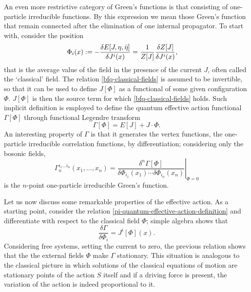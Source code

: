 An even more restrictive category of Green's functions is that consisting of one-particle irreducible functions. By this expression we mean those Green's function that remain connected after the elimination of one internal propagator.
To start with, consider the position
\begin{equation}\label{bfq-classical-fields}
\Phi_i(x)
	:=
- \frac{\delta E[J,\eta,\bar\eta]}{\delta J^i(x)}
	=
\frac{1}{Z[J]} \frac{\delta  Z[J] }{ \delta J^i(x) }  , 
	\hspace{1.25em}
\end{equation}
that is the average value of the field in the presence of the current $J$,
often called the `classical' field. The relation \eqref{bfq-classical-fields} is assumed to be invertible, so that it can be used to define $J[\Phi]$ as a functional of some given configuration $\Phi$. $J[\Phi]$ is then the source term for which \eqref{bfq-classical-fields} holds. Such implicit definition is employed to define the quantum effective action functional \( \Gamma[\Phi] \) through functional Legendre transform
\begin{equation}\label{pi-quantum-effective-action-definition}
\Gamma[\Phi ]
	=
E[J ] + J  \cdot \Phi .
\end{equation}
An interesting property of \(\Gamma\) is that it generates the vertex functions, \ie the one-particle irreducible correlation functions, by differentiation; considering only the bosonic fields,
\begin{equation}
\Gamma_n^{i_1 \ldots i_n} (x_1, \ldots, x_n)
	=
\left.
\frac{\delta^n \Gamma[\Phi ]}{\delta \Phi_{i_1}(x_1)
	 \cdots \delta
	 \Phi_{i_n}(x_n)}%
\right|_{\Phi  =0}
\end{equation}
is the $n$-point one-particle irreducible Green's function.

Let us now discuss some remarkable properties of the effective action. As a starting point, consider the relation \eqref{pi-quantum-effective-action-definition} and differentiate with respect to the classical field $\Phi$; simple algebra shows that 
\begin{equation}\label{eff-act-quantum-eom}
\frac{\delta \Gamma}{\delta \Phi_i} = J^i[\Phi] (x).
\end{equation}
Considering free systems, \ie setting the current to zero, the previous relation shows that the the external fields $\Phi$ make $\Gamma$ stationary. This situation is analogous to the classical picture in which solutions of the classical equations of motion are stationary points of the action $S$ itself and if a driving force is present, the variation of the action is indeed proportional to it.

